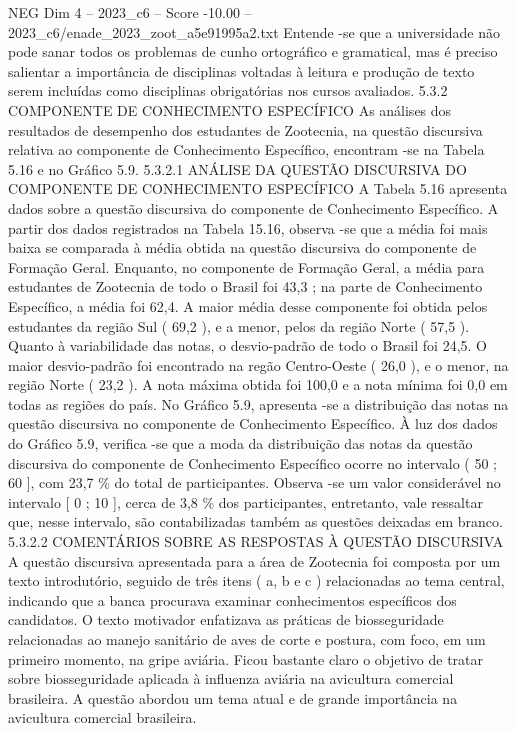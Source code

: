 \begin{textsample}{NEG Dim 4 – 2023\_c6 – Score -10.00 – 2023\_c6/enade\_2023\_zoot\_a5e91995a2.txt}
Entende -se que a universidade não pode sanar todos os problemas de cunho ortográfico e gramatical, mas é preciso salientar a importância de disciplinas voltadas à leitura e produção de texto serem incluídas como disciplinas obrigatórias nos cursos avaliados. 5.3.2 COMPONENTE DE CONHECIMENTO ESPECÍFICO As análises dos resultados de desempenho dos estudantes de Zootecnia, na questão discursiva relativa ao componente de Conhecimento Específico, encontram -se na Tabela 5.16 e no Gráfico 5.9. 5.3.2.1 ANÁLISE DA QUESTÃO DISCURSIVA DO COMPONENTE DE CONHECIMENTO ESPECÍFICO A Tabela 5.16 apresenta dados sobre a questão discursiva do componente de Conhecimento Específico.
A partir dos dados registrados na Tabela 15.16, observa -se que a média foi mais baixa se comparada à média obtida na questão discursiva do componente de Formação Geral.
Enquanto, no componente de Formação Geral, a média para estudantes de Zootecnia de todo o Brasil foi 43,3 ; na parte de Conhecimento Específico, a média foi 62,4.
A maior média desse componente foi obtida pelos estudantes da região Sul ( 69,2 ), e a menor, pelos da região Norte ( 57,5 ).
Quanto à variabilidade das notas, o desvio-padrão de todo o Brasil foi 24,5.
O maior desvio-padrão foi encontrado na regão Centro-Oeste ( 26,0 ), e o menor, na região Norte ( 23,2 ).
A nota máxima obtida foi 100,0 e a nota mínima foi 0,0 em todas as regiões do país.
No Gráfico 5.9, apresenta -se a distribuição das notas na questão discursiva no componente de Conhecimento Específico.
À luz dos dados do Gráfico 5.9, verifica -se que a moda da distribuição das notas da questão discursiva do componente de Conhecimento Específico ocorre no intervalo ( 50 ; 60 ], com 23,7 \% do total de participantes.
Observa -se um valor considerável no intervalo [ 0 ; 10 ], cerca de 3,8 \% dos participantes, entretanto, vale ressaltar que, nesse intervalo, são contabilizadas também as questões deixadas em branco. 5.3.2.2 COMENTÁRIOS SOBRE AS RESPOSTAS À QUESTÃO DISCURSIVA A questão discursiva apresentada para a área de Zootecnia foi composta por um texto introdutório, seguido de três itens ( a, b e c ) relacionadas ao tema central, indicando que a banca procurava examinar conhecimentos específicos dos candidatos.
O texto motivador enfatizava as práticas de biosseguridade relacionadas ao manejo sanitário de aves de corte e postura, com foco, em um primeiro momento, na gripe aviária.
Ficou bastante claro o objetivo de tratar sobre biosseguridade aplicada à influenza aviária na avicultura comercial brasileira.
A questão abordou um tema atual e de grande importância na avicultura comercial brasileira.

\end{textsample}
